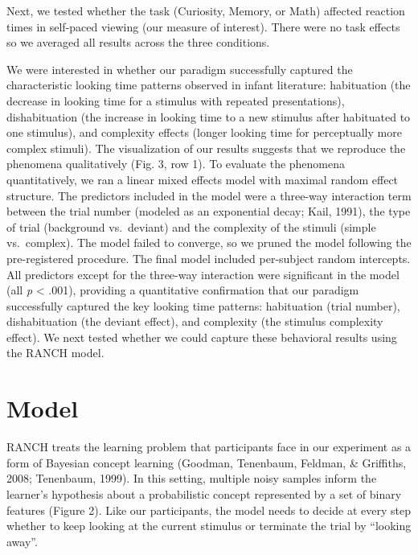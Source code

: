 \documentclass[
  man,floatsintext]{apa6}
\begin{document}
Next, we tested whether the task (Curiosity, Memory, or Math) affected reaction times in self-paced viewing (our measure of interest). There were no task effects so we averaged all results across the three conditions.

We were interested in whether our paradigm successfully captured the characteristic looking time patterns observed in infant literature: habituation (the decrease in looking time for a stimulus with repeated presentations), dishabituation (the increase in looking time to a new stimulus after habituated to one stimulus), and complexity effects (longer looking time for perceptually more complex stimuli). The visualization of our results suggests that we reproduce the phenomena qualitatively (Fig. 3, row 1). To evaluate the phenomena quantitatively, we ran a linear mixed effects model with maximal random effect structure. The predictors included in the model were a three-way interaction term between the trial number (modeled as an exponential decay; Kail, 1991), the type of trial (background vs.~deviant) and the complexity of the stimuli (simple vs.~complex). The model failed to converge, so we pruned the model following the pre-registered procedure. The final model included per-subject random intercepts. All predictors except for the three-way interaction were significant in the model (all \emph{p} \textless{} .001), providing a quantitative confirmation that our paradigm successfully captured the key looking time patterns: habituation (trial number), dishabituation (the deviant effect), and complexity (the stimulus complexity effect). We next tested whether we could capture these behavioral results using the RANCH model.

\hypertarget{model}{%
\section{Model}\label{model}}

RANCH treats the learning problem that participants face in our experiment as a form of Bayesian concept learning (Goodman, Tenenbaum, Feldman, \& Griffiths, 2008; Tenenbaum, 1999). In this setting, multiple noisy samples inform the learner's hypothesis about a probabilistic concept represented by a set of binary features (Figure 2). Like our participants, the model needs to decide at every step whether to keep looking at the current stimulus or terminate the trial by ``looking away''.
\end{document}
